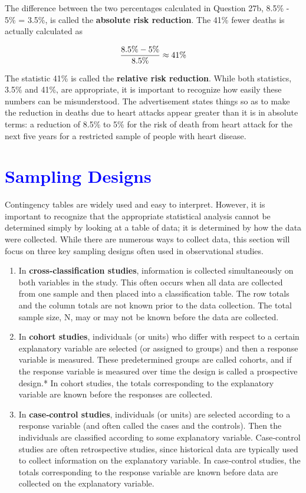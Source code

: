 \documentclass[
]{report}
\begin{document}
The difference between the two percentages calculated in Question 27b, 8.5\% - 5\% = 3.5\%, is called the \textbf{absolute risk reduction}. The 41\% fewer deaths is actually calculated as

\begin{align}
\frac{8.5\% - 5\%}{8.5\%} \approx 41\% 
\notag
\end{align}

The statistic 41\% is called the \textbf{relative risk reduction}. While both statistics, 3.5\% and 41\%, are appropriate, it is important to recognize how easily these numbers can be misunderstood. The advertisement states things so as to make the reduction in deaths due to heart attacks appear greater than it is in absolute terms: a reduction of 8.5\% to 5\% for the risk of death from heart attack for the next five years for a restricted sample of people with heart disease.

\hypertarget{section-56}{%
\section{\texorpdfstring{\textcolor{blue}{Sampling Designs}}{}}\label{section-56}}

Contingency tables are widely used and easy to interpret. However, it is important to recognize that the appropriate statistical analysis cannot be determined simply by looking at a table of data; it is determined by how the data were collected. While there are numerous ways to collect data, this section will focus on three key sampling designs often used in observational studies.

\begin{enumerate}
\def\labelenumi{\arabic{enumi}.}
\item
  In \textbf{cross‑classification studies}, information is collected simultaneously on both variables in the study. This often occurs when all data are collected from one sample and then placed into a classification table. The row totals and the column totals are not known prior to the data collection. The total sample size, N, may or may not be known before the data are collected.
\item
  In \textbf{cohort studies}, individuals (or units) who differ with respect to a certain explanatory variable are selected (or assigned to groups) and then a response variable is measured. These predetermined groups are called cohorts, and if the response variable is measured over time the design is called a prospective design.* In cohort studies, the totals corresponding to the explanatory variable are known before the responses are collected.
\item
  In \textbf{case‑control studies}, individuals (or units) are selected according to a response variable (and often called the cases and the controls). Then the individuals are classified according to some explanatory variable. Case‑control studies are often retrospective studies, since historical data are typically used to collect information on the explanatory variable. In case‑control studies, the totals corresponding to the response variable are known before data are collected on the explanatory variable.
\end{enumerate}
\end{document}
